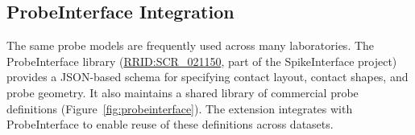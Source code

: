 \documentclass[fleqn,10pt]{article}
\newcommand{\rrid}[1]{\href{https://scicrunch.org/resolver/#1}{#1}}
\begin{document}


\subsection*{ProbeInterface Integration}\label{sec:probeinterface}

The same probe models are frequently used across many laboratories.
The ProbeInterface library (\rrid{RRID:SCR\_021150}, part of the SpikeInterface project)~\citep{garcia_probeinterface_2022} provides a JSON-based schema for specifying contact layout, contact shapes, and probe geometry.
It also maintains a shared library of commercial probe definitions (Figure~\ref{fig:probeinterface}).
The extension integrates with ProbeInterface to enable reuse of these definitions across datasets.
\end{document}

